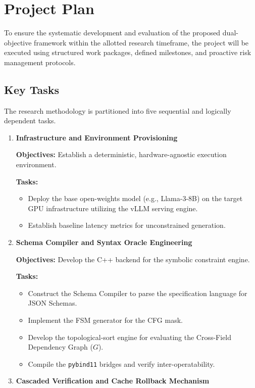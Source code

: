 \section{Project Plan}

To ensure the systematic development and evaluation of the proposed dual-objective 
framework within the allotted research timeframe, the project will be executed using 
structured work packages, defined milestones, and proactive risk management protocols.

\subsection{Key Tasks}
The research methodology is partitioned into five sequential and logically dependent 
tasks.

\begin{enumerate}

\item \textbf{Infrastructure and Environment Provisioning}

\textbf{Objectives:} Establish a deterministic, hardware-agnostic execution environment.

\textbf{Tasks:}
\begin{itemize}
\item Deploy the base open-weights model (e.g., Llama-3-8B) on the target GPU 
infrastructure utilizing the vLLM serving engine.
\item Establish baseline latency metrics for unconstrained generation.
\end{itemize}

\item \textbf{Schema Compiler and Syntax Oracle Engineering}

\textbf{Objectives:} Develop the C++ backend for the symbolic constraint engine.

\textbf{Tasks:}
\begin{itemize}
\item Construct the Schema Compiler to parse the specification language for JSON Schemas.
\item Implement the FSM generator for the CFG mask.
\item Develop the topological-sort engine for evaluating the Cross-Field 
Dependency Graph ($G$).
\item Compile the \texttt{pybind11} bridges and verify inter-operatability.
\end{itemize}

\item \textbf{Cascaded Verification and Cache Rollback Mechanism}


\end{enumerate}
